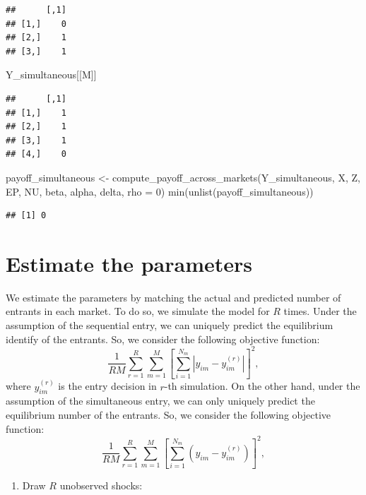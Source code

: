 \documentclass[
]{book}
\newenvironment{Shaded}{\begin{snugshade}}{\end{snugshade}}
\newcommand{\AttributeTok}[1]{\textcolor[rgb]{0.77,0.63,0.00}{#1}}
\newcommand{\DecValTok}[1]{\textcolor[rgb]{0.00,0.00,0.81}{#1}}
\newcommand{\FunctionTok}[1]{\textcolor[rgb]{0.00,0.00,0.00}{#1}}
\newcommand{\NormalTok}[1]{#1}
\newcommand{\OtherTok}[1]{\textcolor[rgb]{0.56,0.35,0.01}{#1}}
\providecommand{\tightlist}{%
  \setlength{\itemsep}{0pt}\setlength{\parskip}{0pt}}
\begin{document}
\begin{verbatim}
##      [,1]
## [1,]    0
## [2,]    1
## [3,]    1
\end{verbatim}

\begin{Shaded}
\begin{Highlighting}[]
\NormalTok{Y\_simultaneous[[M]]}
\end{Highlighting}
\end{Shaded}

\begin{verbatim}
##      [,1]
## [1,]    1
## [2,]    1
## [3,]    1
## [4,]    0
\end{verbatim}

\begin{Shaded}
\begin{Highlighting}[]
\NormalTok{payoff\_simultaneous }\OtherTok{\textless{}{-}}
  \FunctionTok{compute\_payoff\_across\_markets}\NormalTok{(Y\_simultaneous, X, Z, EP, NU, beta, alpha, delta, }\AttributeTok{rho =} \DecValTok{0}\NormalTok{)}
\FunctionTok{min}\NormalTok{(}\FunctionTok{unlist}\NormalTok{(payoff\_simultaneous))}
\end{Highlighting}
\end{Shaded}

\begin{verbatim}
## [1] 0
\end{verbatim}

\hypertarget{estimate-the-parameters-4}{%
\section{Estimate the parameters}\label{estimate-the-parameters-4}}

We estimate the parameters by matching the actual and predicted number of entrants in each market. To do so, we simulate the model for \(R\) times.
Under the assumption of the sequential entry, we can uniquely predict the equilibrium identify of the entrants. So, we consider the following objective function:
\[
\frac{1}{RM}\sum_{r = 1}^R \sum_{m = 1}^M \left[\sum_{i = 1}^{N_m}|y_{im} - y_{im}^{(r)}| \right]^2,
\]
where \(y_{im}^{(r)}\) is the entry decision in \(r\)-th simulation. On the other hand, under the assumption of the simultaneous entry, we can only uniquely predict the equilibrium number of the entrants. So, we consider the following objective function:
\[
\frac{1}{RM}\sum_{r = 1}^R \sum_{m = 1}^M \left[\sum_{i = 1}^{N_m}(y_{im} - y_{im}^{(r)}) \right]^2,
\]

\begin{enumerate}
\def\labelenumi{\arabic{enumi}.}
\tightlist
\item
  Draw \(R\) unobserved shocks:
\end{enumerate}
\end{document}
